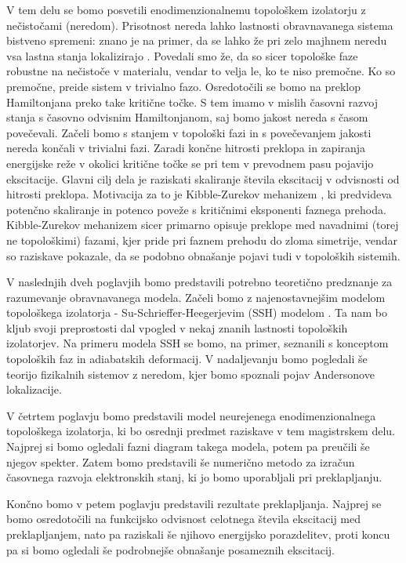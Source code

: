V tem delu se bomo posvetili enodimenzionalnemu topološkem izolatorju z nečistočami (neredom). Prisotnost nereda lahko lastnosti obravnavanega sistema bistveno spremeni: znano je na primer, da se lahko že pri zelo majhnem neredu vsa lastna stanja lokalizirajo \cite{anders}. Povedali smo že, da so sicer topološke faze robustne na nečistoče v materialu, vendar to velja le, ko te niso premočne. Ko so premočne, preide sistem v trivialno fazo.
Osredotočili se bomo na preklop Hamiltonjana preko take kritične točke. S tem imamo v mislih časovni razvoj stanja s časovno odvisnim Hamiltonjanom, saj bomo jakost nereda s časom povečevali. Začeli bomo s stanjem v topološki fazi in s povečevanjem jakosti nereda končali v trivialni fazi. Zaradi končne hitrosti preklopa in zapiranja energijske reže v okolici kritične točke se pri tem v prevodnem pasu pojavijo ekscitacije. Glavni cilj dela je raziskati skaliranje števila ekscitacij v odvisnosti od hitrosti preklopa. Motivacija za to je Kibble-Zurekov mehanizem \cite{kibble}, ki predvideva potenčno skaliranje in potenco poveže s kritičnimi eksponenti faznega prehoda. Kibble-Zurekov mehanizem sicer primarno opisuje preklope med navadnimi (torej ne topološkimi) fazami, kjer pride pri faznem prehodu do zloma simetrije, vendar so raziskave  \cite{uvod1, uvod2, lara1} pokazale, da se podobno obnašanje pojavi tudi v topoloških sistemih.

V naslednjih dveh poglavjih bomo predstavili potrebno teoretično predznanje za razumevanje obravnavanega modela.
Začeli bomo z najenostavnejšim modelom topološkega izolatorja - Su-Schrieffer-Heegerjevim (SSH) modelom \cite{SSH}. Ta nam bo kljub svoji preprostosti dal vpogled v nekaj znanih lastnosti topoloških izolatorjev. Na primeru modela SSH se bomo, na primer, seznanili s konceptom topoloških faz in adiabatskih deformacij. V nadaljevanju bomo pogledali še teorijo fizikalnih sistemov z neredom, kjer bomo spoznali pojav Andersonove lokalizacije.

V četrtem poglavju bomo predstavili model neurejenega enodimenzionalnega topološkega izolatorja, ki bo osrednji predmet raziskave v tem magistrskem delu. Najprej si bomo ogledali fazni diagram takega modela, potem pa preučili še njegov spekter. Zatem bomo predstavili še numerično metodo za izračun časovnega razvoja elektronskih stanj, ki jo bomo uporabljali pri preklapljanju.

Končno bomo v petem poglavju predstavili rezultate preklapljanja. Najprej se bomo osredotočili na funkcijsko odvisnost celotnega števila ekscitacij med preklapljanjem, nato pa raziskali še njihovo energijsko porazdelitev, proti koncu pa si bomo ogledali še podrobnejše obnašanje posameznih ekscitacij.

